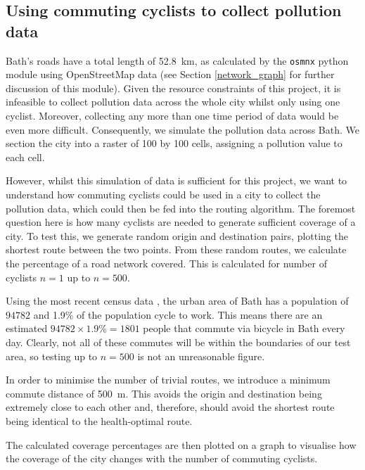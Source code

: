 \documentclass[11pt,twosided,a4paper]{report}
\begin{document}
\subsection{Using commuting cyclists to collect pollution data}
% 

Bath's roads have a total length of 52.8~km, as calculated by the \texttt{osmnx} python module using OpenStreetMap data (see Section \ref{network_graph} for further discussion of this module). Given the resource constraints of this project, it is infeasible to collect pollution data across the whole city whilst only using one cyclist. Moreover, collecting any more than one time period of data would be even more difficult. Consequently, we simulate the pollution data across Bath. We section the city into a raster of 100 by 100 cells, assigning a pollution value to each cell.

However, whilst this simulation of data is sufficient for this project, we want to understand how commuting cyclists could be used in a city to collect the pollution data, which could then be fed into the routing algorithm. The foremost question here is how many cyclists are needed to generate sufficient coverage of a city. To test this, we generate random origin and destination pairs, plotting the shortest route between the two points. From these random routes, we calculate the percentage of a road network covered. This is calculated for number of cyclists $n=1$ up to $n=500$.

Using the most recent census data \citep{ons2011census}, the urban area of Bath has a population of $94782$ and 1.9\% of the population cycle to work. This means there are an estimated $94782 \times 1.9\% = 1801$ people that commute via bicycle in Bath every day. Clearly, not all of these commutes will be within the boundaries of our test area, so testing up to $n=500$ is not an unreasonable figure.

In order to minimise the number of trivial routes, we introduce a minimum commute distance of 500~m. This avoids the origin and destination being extremely close to each other and, therefore, should avoid the shortest route being identical to the health-optimal route.

The calculated coverage percentages are then plotted on a graph to visualise how the coverage of the city changes with the number of commuting cyclists.
\end{document}
